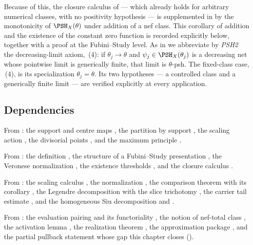 Because of this, the closure calculus of  ---
which already holds for arbitrary numerical classes, with no positivity
hypothesis --- is supplemented in  by the
monotonicity of $\PSH_X(\theta)$ under addition of a nef class.  This
corollary of addition and the existence of the constant zero function is
recorded explicitly below, together with a proof at the Fubini--Study level.  As in
 we abbreviate by \emph{PSH2} the
decreasing-limit axiom, \,(4): if
$\theta_j\to\theta$ and $\psi_j\in\PSH_X(\theta_j)$ is a decreasing net
whose pointwise limit is generically finite, that limit is
$\theta$-psh.  The fixed-class case, \,(4), is
its specialization $\theta_j=\theta$.  Its two hypotheses --- a controlled class and a
generically finite limit --- are verified explicitly at every application.

\subsection{Dependencies}
\label{sec:ch39-dependencies}

From : the support and centre maps
, the partition by support
, the scaling action
, the divisorial points
, and the maximum principle
.

From : the definition , the
structure of a Fubini--Study presentation
, the Veronese normalization
, the existence thresholds
, and the closure calculus
.

From : the scaling calculus
, the normalization
, the comparison theorem
 with its corollary
, the Legendre decomposition
 with the slice trichotomy
, the carrier tail estimate
, and the homogeneous Siu decomposition
 and
.

From : the evaluation pairing
 and its functoriality
, the notion of nef-total class
, the activation lemma ,
the realization theorem , the
approximation package , and the
partial pullback statement  whose gap
this chapter closes ().

